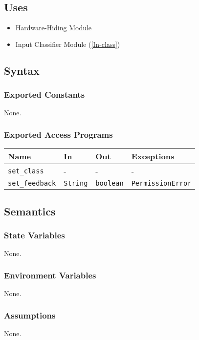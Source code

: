 \documentclass[12pt, titlepage]{article}
\def\code#1{\texttt{#1}}
\begin{document}
\subsection{Uses}
\begin{itemize}
  \item Hardware-Hiding Module  
  \item Input Classifier Module (\ref{In-class})
\end{itemize}


\subsection{Syntax}

\subsubsection{Exported Constants}
None.

\subsubsection{Exported Access Programs}

\begin{center}
\begin{tabular}{p{2.5cm} p{4cm} p{4cm} p{3cm}}
\hline
\textbf{Name} & \textbf{In} & \textbf{Out} & \textbf{Exceptions} \\
\hline
\code{set\_class} & - & - & - \\
\code{set\_feedback} & \code{String} & \code{boolean} &  \code{PermissionError}\\
\hline
\end{tabular}
\end{center}

\subsection{Semantics}

\subsubsection{State Variables}
None.

\subsubsection{Environment Variables}
None.

\subsubsection{Assumptions}
None.
\end{document}

